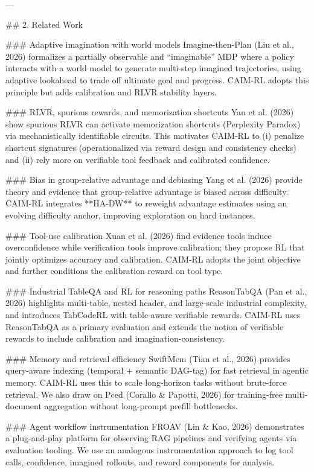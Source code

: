 ---

## 2. Related Work  

### Adaptive imagination with world models  
Imagine-then-Plan (Liu et al., 2026) formalizes a partially observable and “imaginable” MDP where a policy interacts with a world model to generate multi-step imagined trajectories, using adaptive lookahead to trade off ultimate goal and progress. CAIM-RL adopts this principle but adds calibration and RLVR stability layers.

### RLVR, spurious rewards, and memorization shortcuts  
Yan et al. (2026) show spurious RLVR can activate memorization shortcuts (Perplexity Paradox) via mechanistically identifiable circuits. This motivates CAIM-RL to (i) penalize shortcut signatures (operationalized via reward design and consistency checks) and (ii) rely more on verifiable tool feedback and calibrated confidence.

### Bias in group-relative advantage and debiasing  
Yang et al. (2026) provide theory and evidence that group-relative advantage is biased across difficulty. CAIM-RL integrates **HA-DW** to reweight advantage estimates using an evolving difficulty anchor, improving exploration on hard instances.

### Tool-use calibration  
Xuan et al. (2026) find evidence tools induce overconfidence while verification tools improve calibration; they propose RL that jointly optimizes accuracy and calibration. CAIM-RL adopts the joint objective and further conditions the calibration reward on tool type.

### Industrial TableQA and RL for reasoning paths  
ReasonTabQA (Pan et al., 2026) highlights multi-table, nested header, and large-scale industrial complexity, and introduces TabCodeRL with table-aware verifiable rewards. CAIM-RL uses ReasonTabQA as a primary evaluation and extends the notion of verifiable rewards to include calibration and imagination-consistency.

### Memory and retrieval efficiency  
SwiftMem (Tian et al., 2026) provides query-aware indexing (temporal + semantic DAG-tag) for fast retrieval in agentic memory. CAIM-RL uses this to scale long-horizon tasks without brute-force retrieval. We also draw on Pced (Corallo & Papotti, 2026) for training-free multi-document aggregation without long-prompt prefill bottlenecks.

### Agent workflow instrumentation  
FROAV (Lin & Kao, 2026) demonstrates a plug-and-play platform for observing RAG pipelines and verifying agents via evaluation tooling. We use an analogous instrumentation approach to log tool calls, confidence, imagined rollouts, and reward components for analysis.

